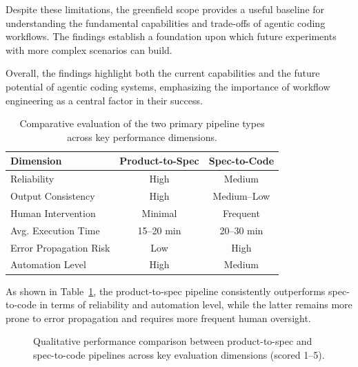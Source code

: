 \documentclass[a4paper,12pt]{report}
\begin{document}
Despite these limitations, the greenfield scope provides a useful baseline for understanding the fundamental capabilities and trade-offs of agentic coding workflows. The findings establish a foundation upon which future experiments with more complex scenarios can build.

Overall, the findings highlight both the current capabilities and the future potential of agentic coding systems, emphasizing the importance of workflow engineering as a central factor in their success.

\begin{table}[h!]
\caption[Pipeline comparison]{Comparative evaluation of the two primary pipeline types across key performance dimensions.}
\begin{center}
\begin{tabular}{|l|c|c|} \hline
\textbf{Dimension} & \textbf{Product-to-Spec} & \textbf{Spec-to-Code} \\\hline
Reliability & High & Medium \\\hline
Output Consistency & High & Medium--Low \\\hline
Human Intervention & Minimal & Frequent \\\hline
Avg. Execution Time & 15--20 min & 20--30 min \\\hline
Error Propagation Risk & Low & High \\\hline
Automation Level & High & Medium \\\hline
\end{tabular}
\label{table:pipelineComparison}
\end{center}
\end{table}

As shown in Table~\ref{table:pipelineComparison}, the product-to-spec pipeline consistently outperforms spec-to-code in terms of reliability and automation level, while the latter remains more prone to error propagation and requires more frequent human oversight.

\begin{figure}[h!]
\centering
{}
\caption{Qualitative performance comparison between product-to-spec and spec-to-code pipelines across key evaluation dimensions (scored 1--5).}
\label{fig:pipelineChart}
\end{figure}
\end{document}

